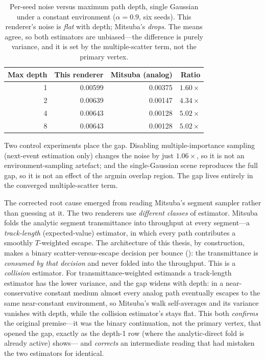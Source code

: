 \begin{table}[htp]
  \centering
  \begin{tabular}{@{}rrrr@{}}
    \toprule
    Max depth & This renderer & Mitsuba (analog) & Ratio \\
    \midrule
    1 & 0.00599 & 0.00375 & $1.60\times$ \\
    2 & 0.00639 & 0.00147 & $4.34\times$ \\
    4 & 0.00643 & 0.00128 & $5.02\times$ \\
    8 & 0.00643 & 0.00128 & $5.02\times$ \\
    \bottomrule
  \end{tabular}
  \caption{Per-seed noise versus maximum path depth, single Gaussian under a constant environment
  ($\alpha = 0.9$, six seeds). This renderer's noise is \emph{flat} with depth; Mitsuba's
  \emph{drops}. The means agree, so both estimators are unbiased---the difference is purely variance,
  and it is set by the multiple-scatter term, not the primary vertex.}
  \label{tab:a1-depth}
\end{table}

Two control experiments place the gap. Disabling multiple-importance sampling (next-event estimation
only) changes the noise by just $1.06\times$, so it is not an environment-sampling artefact; and the
single-Gaussian scene reproduces the full gap, so it is not an effect of the argmin overlap region.
The gap lives entirely in the converged multiple-scatter term.

The corrected root cause emerged from reading Mitsuba's segment sampler rather than guessing at it.
The two renderers use \emph{different classes} of estimator. Mitsuba folds the analytic segment
transmittance into throughput at every segment---a \emph{track-length} (expected-value) estimator, in
which every path contributes a smoothly $T$-weighted escape. The architecture of this thesis, by
construction, makes a binary scatter-versus-escape decision per bounce (): the
transmittance is \emph{consumed by that decision} and never folded into the throughput. This is a
\emph{collision} estimator. For transmittance-weighted estimands a track-length estimator has the
lower variance, and the gap widens with depth: in a near-conservative constant medium almost every
analog path eventually escapes to the same near-constant environment, so Mitsuba's walk self-averages
and its variance vanishes with depth, while the collision estimator's stays flat. This both
\emph{confirms} the original premise---it was the binary continuation, not the primary vertex, that
opened the gap, exactly as the depth-1 row (where the analytic-direct fold is already active) shows---
and \emph{corrects} an intermediate reading that had mistaken the two estimators for identical.

